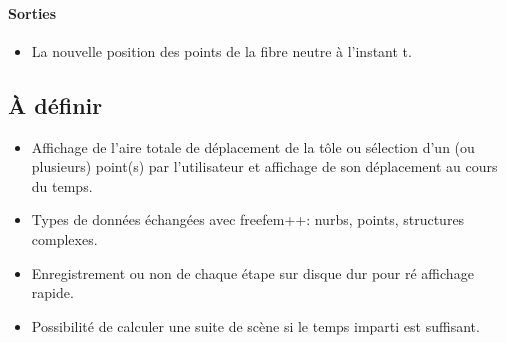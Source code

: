 \paragraph{Sorties}
\begin{itemize}
    \item La nouvelle position des points de la fibre neutre à l'instant t.
\end{itemize}

\subsection{À définir}
\begin{itemize}
    \item Affichage de l'aire totale de déplacement de la tôle ou sélection d'un (ou plusieurs) point(s) par l'utilisateur et affichage de son déplacement au cours du temps.
    \item Types de données échangées avec freefem++: nurbs, points, structures complexes.
    \item Enregistrement ou non de chaque étape sur disque dur pour ré affichage rapide.
    \item Possibilité de calculer une suite de scène si le temps imparti est suffisant.
\end{itemize}

